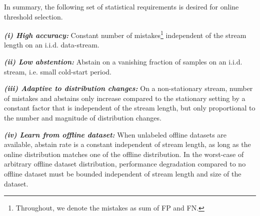  
In summary, the following set of statistical requirements is desired for online threshold selection.
 
    \emph{\textbf{(i) High accuracy:}} Constant number of mistakes\footnote{Throughout, we denote the mistakes as sum of FP and FN.} independent of the stream length on an i.i.d. data-stream.

      \vspace{-1mm}
     \emph{\textbf{(ii) Low abstention:}} Abstain on a vanishing fraction of samples on an i.i.d. stream, i.e. small cold-start period. 

     \vspace{-1mm}
    \emph{\textbf{(iii) Adaptive to distribution changes:}} On a non-stationary stream, number of mistakes and abstains only increase compared to the stationary setting by a constant factor that is independent of the stream length, but only proportional to the number and magnitude of distribution changes. 
    
    \vspace{-1mm}
       \emph{\textbf{(iv) Learn from offline dataset:}} When unlabeled offline datasets are available, abstain rate is a constant independent of stream length, as long as the online distribution matches one of the offline distribution. In the worst-case of arbitrary offline dataset distribution, performance degradation compared to no offline dataset must be bounded independent of stream length and size of the dataset.

       \vspace{-1mm}

